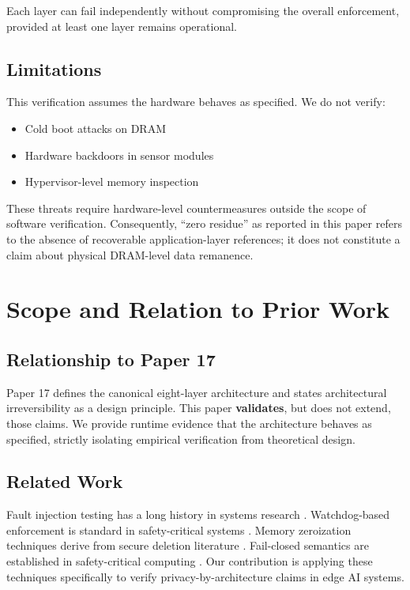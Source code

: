 \documentclass[conference]{IEEEtran}
\begin{document}
Each layer can fail independently without compromising the overall enforcement, provided at least one layer remains operational.

\subsection{Limitations}
This verification assumes the hardware behaves as specified. We do not verify:
\begin{itemize}
    \item Cold boot attacks on DRAM
    \item Hardware backdoors in sensor modules
    \item Hypervisor-level memory inspection
\end{itemize}

These threats require hardware-level countermeasures outside the scope of software verification. Consequently, ``zero residue'' as reported in this paper refers to the absence of recoverable application-layer references; it does not constitute a claim about physical DRAM-level data remanence.

\section{Scope and Relation to Prior Work}

\subsection{Relationship to Paper 17}
Paper 17 \cite{b17} defines the canonical eight-layer architecture and states architectural irreversibility as a design principle. This paper \textbf{validates}, but does not extend, those claims. We provide runtime evidence that the architecture behaves as specified, strictly isolating empirical verification from theoretical design. 

\subsection{Related Work}
Fault injection testing has a long history in systems research \cite{b1, b2}. Watchdog-based enforcement is standard in safety-critical systems \cite{b3}. Memory zeroization techniques derive from secure deletion literature \cite{b4}. Fail-closed semantics are established in safety-critical computing \cite{b5}. Our contribution is applying these techniques specifically to verify privacy-by-architecture claims in edge AI systems.
\end{document}
